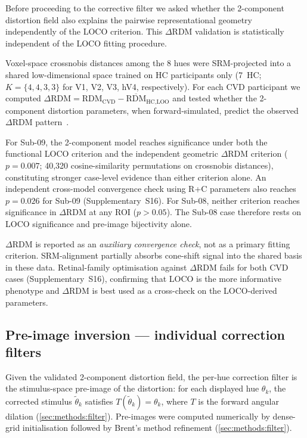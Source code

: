 Before proceeding to the corrective filter we asked whether the 2-component
distortion field also explains the pairwise representational geometry
independently of the LOCO criterion. This $\Delta$RDM validation is
statistically independent of the LOCO fitting procedure.

Voxel-space crossnobis distances among the 8 hues were SRM-projected into a
shared low-dimensional space trained on HC participants only (7~HC;
$K = \{4, 4, 3, 3\}$ for V1, V2, V3, hV4, respectively). For each CVD
participant we computed
$\Delta\text{RDM} = \text{RDM}_{\text{CVD}} - \overline{\text{RDM}}_{\text{HC,LOO}}$
and tested whether the 2-component distortion parameters, when
forward-simulated, predict the observed $\Delta$RDM
pattern~\cite{schuett2023, chen2015, bannert2025}.

For Sub-09, the 2-component model reaches significance under both the
functional LOCO criterion and the independent geometric $\Delta$RDM
criterion ($p = 0.007$; 40{,}320 cosine-similarity permutations on
crossnobis distances), constituting stronger case-level evidence than
either criterion alone. An independent cross-model convergence check
using R+C parameters also reaches $p = 0.026$ for Sub-09 (Supplementary~S16).
For Sub-08, neither criterion reaches significance in $\Delta$RDM at any
ROI ($p > 0.05$). The Sub-08 case therefore rests on LOCO significance
and pre-image bijectivity alone.

$\Delta$RDM is reported as an \emph{auxiliary convergence check}, not as a
primary fitting criterion. SRM-alignment partially absorbs cone-shift signal
into the shared basis in these data. Retinal-family optimisation against
$\Delta$RDM fails for both CVD cases (Supplementary~S16), confirming that
LOCO is the more informative phenotype and $\Delta$RDM is best used as a
cross-check on the LOCO-derived parameters.

\subsection{Pre-image inversion --- individual correction filters}
\label{sec:results:filter}

Given the validated 2-component distortion field, the per-hue correction
filter is the stimulus-space pre-image of the distortion: for each displayed
hue $\theta_k$, the corrected stimulus $\tilde{\theta}_k$ satisfies
$T(\tilde{\theta}_k) = \theta_k$, where $T$ is the forward angular dilation
(\cref{sec:methods:filter}). Pre-images were computed numerically by
dense-grid initialisation followed by Brent's method refinement
(\cref{sec:methods:filter}).

